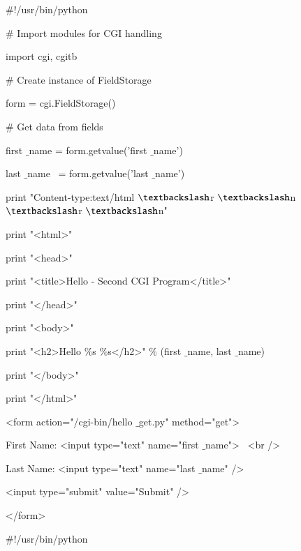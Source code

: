 \documentclass[a4paper,12pt]{report}
\begin{document}
\noindent 
 $  \#  $!/usr/bin/python \par
\vspace{12pt}
\noindent 
 $  \#  $ Import modules for CGI handling  \par
\noindent 
import cgi, cgitb  \par
\vspace{12pt}
\noindent 
 $  \#  $ Create instance of FieldStorage  \par
\noindent 
form = cgi.FieldStorage()  \par
\vspace{12pt}
\noindent 
 $  \#  $ Get data from fields \par
\noindent 
first $  \_  $name = form.getvalue('first $  \_  $name') \par
\noindent 
last $  \_  $name~ = form.getvalue('last $  \_  $name') \par
\vspace{12pt}
\noindent 
print "Content-type:text/html $  \textbackslash  $r $  \textbackslash  $n $  \textbackslash  $r $  \textbackslash  $n" \par
\noindent 
print "<html>" \par
\noindent 
print "<head>" \par
\noindent 
print "<title>Hello - Second CGI Program</title>" \par
\noindent 
print "</head>" \par
\noindent 
print "<body>" \par
\noindent 
print "<h2>Hello  $  \%  $s  $  \%  $s</h2>"  $  \%  $ (first $  \_  $name, last $  \_  $name) \par
\noindent 
print "</body>" \par
\noindent 
print "</html>" \par
\vspace{12pt}
\noindent 
<form action="/cgi-bin/hello $  \_  $get.py" method="get"> \par
\noindent 
First Name: <input type="text" name="first $  \_  $name">~ <br /> \par
\vspace{12pt}
\noindent 
Last Name: <input type="text" name="last $  \_  $name" /> \par
\noindent 
<input type="submit" value="Submit" /> \par
\noindent 
</form> \par
\vspace{12pt}
\noindent 
 $  \#  $!/usr/bin/python \par
\vspace{12pt}
\end{document}
